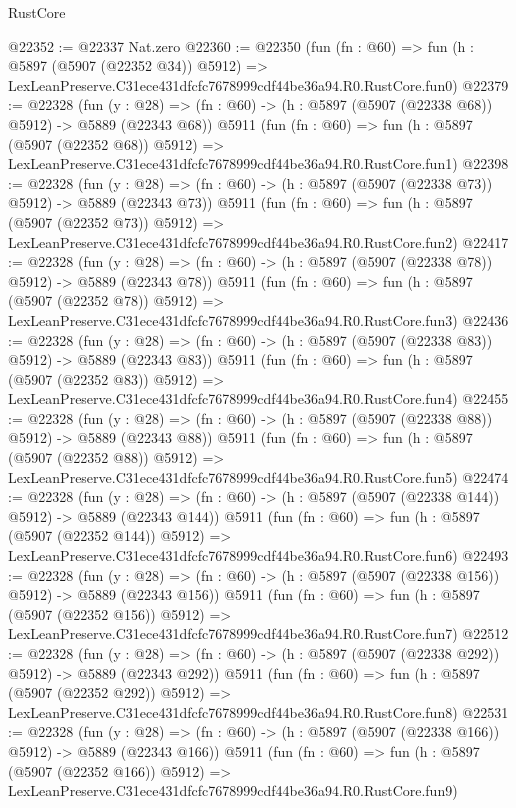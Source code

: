 \begin{lexlean}{RustCore}
\begin{coremodule}
@22352 := @22337 Nat.zero
@22360 := @22350
    (fun (fn : @60) =>
    fun (h : @5897 (@5907 (@22352 @34)) @5912) =>
    LexLeanPreserve.C31ece431dfcfc7678999cdf44be36a94.R0.RustCore.fun0)
@22379 := @22328
    (fun (y : @28) => (fn : @60) -> (h : @5897 (@5907 (@22338 @68)) @5912) -> @5889 (@22343 @68))
    @5911
    (fun (fn : @60) =>
    fun (h : @5897 (@5907 (@22352 @68)) @5912) =>
    LexLeanPreserve.C31ece431dfcfc7678999cdf44be36a94.R0.RustCore.fun1)
@22398 := @22328
    (fun (y : @28) => (fn : @60) -> (h : @5897 (@5907 (@22338 @73)) @5912) -> @5889 (@22343 @73))
    @5911
    (fun (fn : @60) =>
    fun (h : @5897 (@5907 (@22352 @73)) @5912) =>
    LexLeanPreserve.C31ece431dfcfc7678999cdf44be36a94.R0.RustCore.fun2)
@22417 := @22328
    (fun (y : @28) => (fn : @60) -> (h : @5897 (@5907 (@22338 @78)) @5912) -> @5889 (@22343 @78))
    @5911
    (fun (fn : @60) =>
    fun (h : @5897 (@5907 (@22352 @78)) @5912) =>
    LexLeanPreserve.C31ece431dfcfc7678999cdf44be36a94.R0.RustCore.fun3)
@22436 := @22328
    (fun (y : @28) => (fn : @60) -> (h : @5897 (@5907 (@22338 @83)) @5912) -> @5889 (@22343 @83))
    @5911
    (fun (fn : @60) =>
    fun (h : @5897 (@5907 (@22352 @83)) @5912) =>
    LexLeanPreserve.C31ece431dfcfc7678999cdf44be36a94.R0.RustCore.fun4)
@22455 := @22328
    (fun (y : @28) => (fn : @60) -> (h : @5897 (@5907 (@22338 @88)) @5912) -> @5889 (@22343 @88))
    @5911
    (fun (fn : @60) =>
    fun (h : @5897 (@5907 (@22352 @88)) @5912) =>
    LexLeanPreserve.C31ece431dfcfc7678999cdf44be36a94.R0.RustCore.fun5)
@22474 := @22328
    (fun (y : @28) => (fn : @60) -> (h : @5897 (@5907 (@22338 @144)) @5912) -> @5889 (@22343 @144))
    @5911
    (fun (fn : @60) =>
    fun (h : @5897 (@5907 (@22352 @144)) @5912) =>
    LexLeanPreserve.C31ece431dfcfc7678999cdf44be36a94.R0.RustCore.fun6)
@22493 := @22328
    (fun (y : @28) => (fn : @60) -> (h : @5897 (@5907 (@22338 @156)) @5912) -> @5889 (@22343 @156))
    @5911
    (fun (fn : @60) =>
    fun (h : @5897 (@5907 (@22352 @156)) @5912) =>
    LexLeanPreserve.C31ece431dfcfc7678999cdf44be36a94.R0.RustCore.fun7)
@22512 := @22328
    (fun (y : @28) => (fn : @60) -> (h : @5897 (@5907 (@22338 @292)) @5912) -> @5889 (@22343 @292))
    @5911
    (fun (fn : @60) =>
    fun (h : @5897 (@5907 (@22352 @292)) @5912) =>
    LexLeanPreserve.C31ece431dfcfc7678999cdf44be36a94.R0.RustCore.fun8)
@22531 := @22328
    (fun (y : @28) => (fn : @60) -> (h : @5897 (@5907 (@22338 @166)) @5912) -> @5889 (@22343 @166))
    @5911
    (fun (fn : @60) =>
    fun (h : @5897 (@5907 (@22352 @166)) @5912) =>
    LexLeanPreserve.C31ece431dfcfc7678999cdf44be36a94.R0.RustCore.fun9)

\end{coremodule}
\end{lexlean}
